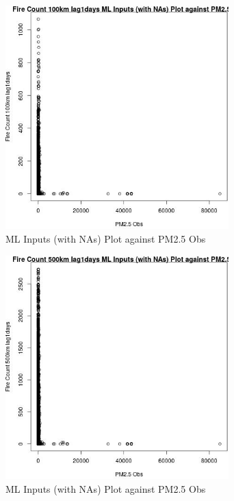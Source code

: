 \begin{figure} 
\centering  
\includegraphics[width=0.77\textwidth]{Code_Outputs/Report_ML_input_PM25_Step4_part_f_de_duplicated_aveswNAs_Fire_Count_100km_lag1daysvPM25_Obs.jpg} 
\caption{\label{fig:Report_ML_input_PM25_Step4_part_f_de_duplicated_aveswNAsFire_Count_100km_lag1daysvPM25_Obs}ML Inputs (with NAs) Plot against PM2.5 Obs} 
\end{figure} 
 

\begin{figure} 
\centering  
\includegraphics[width=0.77\textwidth]{Code_Outputs/Report_ML_input_PM25_Step4_part_f_de_duplicated_aveswNAs_Fire_Count_500km_lag1daysvPM25_Obs.jpg} 
\caption{\label{fig:Report_ML_input_PM25_Step4_part_f_de_duplicated_aveswNAsFire_Count_500km_lag1daysvPM25_Obs}ML Inputs (with NAs) Plot against PM2.5 Obs} 
\end{figure} 
 

